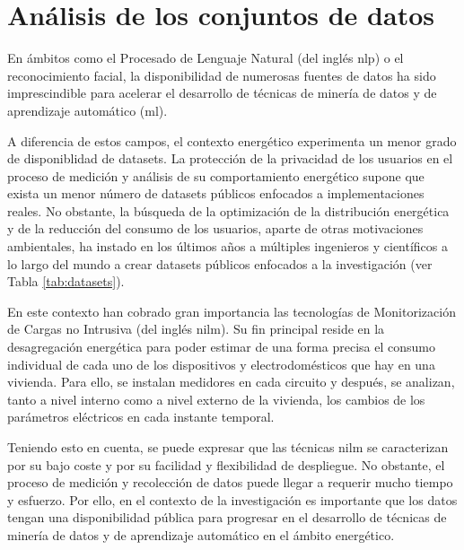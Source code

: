 \section{Análisis de los conjuntos de datos}
\label{sec:sustdata}

En ámbitos como el Procesado de Lenguaje Natural (del inglés \gls{nlp}) o el reconocimiento facial, la disponibilidad de numerosas fuentes de datos ha sido imprescindible para acelerar el desarrollo de técnicas de minería de datos y de aprendizaje automático (\gls{ml}).

\vspace{3mm}

A diferencia de estos campos, el contexto energético experimenta un menor grado de disponiblidad de datasets. La protección de la privacidad de los usuarios en el proceso de medición y análisis de su comportamiento energético supone que exista un menor número de datasets públicos enfocados a implementaciones reales. No obstante, la búsqueda de la optimización de la distribución energética y de la reducción del consumo de los usuarios, aparte de otras motivaciones ambientales, ha instado en los últimos años a múltiples ingenieros y científicos a lo largo del mundo a crear datasets públicos enfocados a la investigación (ver Tabla \ref{tab:datasets}). 

\vspace{3mm}

En este contexto han cobrado gran importancia las tecnologías de Monitorización de Cargas no Intrusiva (del inglés \gls{nilm}). Su fin principal reside en la desagregación energética para poder estimar de una forma precisa el consumo individual de cada uno de los dispositivos y electrodomésticos que hay en una vivienda. Para ello, se instalan medidores en cada circuito y después, se analizan, tanto a nivel interno como a nivel externo de la vivienda, los cambios de los parámetros eléctricos en cada instante temporal.~\cite{nilm} \cite{greend}

\vspace{3mm}

Teniendo esto en cuenta, se puede expresar que las técnicas \gls{nilm} se caracterizan por su bajo coste y por su facilidad y flexibilidad de despliegue. No obstante, el proceso de medición y recolección de datos puede llegar a requerir mucho tiempo y esfuerzo. Por ello, en el contexto de la investigación es importante que los datos tengan una disponibilidad pública para progresar en el desarrollo de técnicas de minería de datos y de aprendizaje automático en el ámbito energético. 

